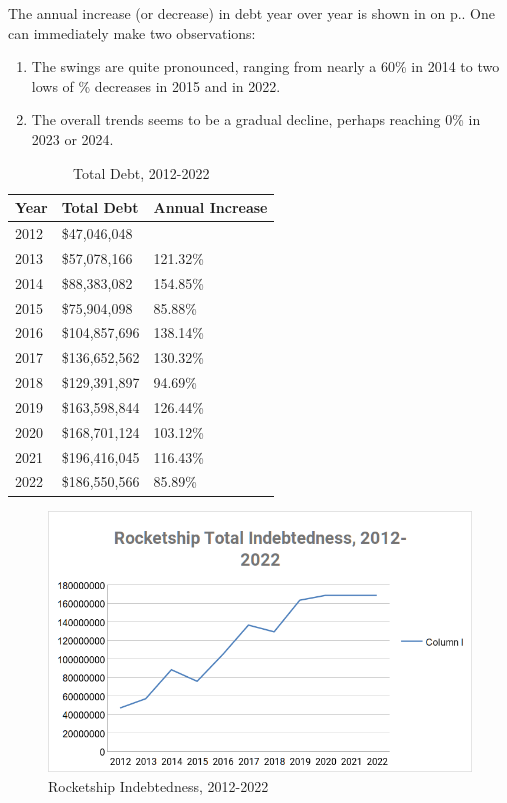 The annual increase (or decrease) in debt year over year is shown in  on p.\pageref{fig:annual_debt_increases}. One can immediately make two observations:
\begin{enumerate}
  \item The swings are quite pronounced, ranging from nearly a 60\% in 2014 to two lows of \% decreases in 2015 and in 2022.
  \item The overall trends seems to be a gradual decline, perhaps reaching 0\% in 2023 or 2024.
\end{enumerate}

\begin{table}[ht]\caption{Total Debt, 2012-2022}\label{tab:total_debt}
  \begin{tabular}{lll}
    \toprule
    \textbf{Year} & \textbf{Total Debt} & \textbf{Annual Increase}\\
    \midrule
    2012 &  \$47,046,048 & \\
    2013 &  \$57,078,166 & 121.32\% \\
    2014 &  \$88,383,082 & 154.85\% \\
    2015 &  \$75,904,098 &  85.88\% \\
    2016 & \$104,857,696 & 138.14\% \\
    2017 & \$136,652,562 & 130.32\% \\
    2018 & \$129,391,897 &  94.69\% \\
    2019 & \$163,598,844 & 126.44\% \\
    2020 & \$168,701,124 & 103.12\% \\ 
    2021 & \$196,416,045 & 116.43\% \\
    2022 & \$186,550,566 &  85.89\% \\
    \bottomrule
  \end{tabular}
\end{table}

\begin{figure}[t]
  \centering
  \includegraphics[width=\textwidth,keepaspectratio]{Debt}%
  \caption{Rocketship Indebtedness, 2012-2022}%
  \label{fig:total_debt}
\end{figure}

